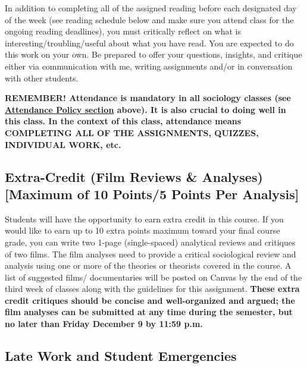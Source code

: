 \documentclass[11pt,]{article}
\begin{document}
In addition to completing all of the assigned reading before each
designated day of the week (see reading schedule below and make sure you
attend class for the ongoing reading deadlines), you must critically
reflect on what is interesting/troubling/useful about what you have
read. You are expected to do this work on your own. Be prepared to offer
your questions, insights, and critique either via communication with me,
writing assignments and/or in conversation with other students.

\textbf{REMEMBER! Attendance is mandatory in all sociology classes (see
\protect\hyperlink{attendance}{Attendance Policy section} above). It is
also crucial to doing well in this class. In the context of this class,
attendance means COMPLETING ALL OF THE ASSIGNMENTS, QUIZZES, INDIVIDUAL
WORK, etc.}

\hypertarget{extra-credit-film-reviews-analyses-maximum-of-10-points5-points-per-analysis}{%
\subsection{Extra-Credit (Film Reviews \& Analyses) {[}Maximum of 10
Points/5 Points Per
Analysis{]}}\label{extra-credit-film-reviews-analyses-maximum-of-10-points5-points-per-analysis}}

Students will have the opportunity to earn extra credit in this course.
If you would like to earn up to 10 extra points maximum toward your
final course grade, you can write two 1-page (single-spaced) analytical
reviews and critiques of two films. The film analyses need to provide a
critical sociological review and analysis using one or more of the
theories or theorists covered in the course. A list of suggested films/
documentaries will be posted on Canvas by the end of the third week of
classes along with the guidelines for this assignment. \textbf{These
extra credit critiques should be concise and well-organized and argued;
the film analyses can be submitted at any time during the semester, but
no later than Friday December 9 by 11:59 p.m.}

\hypertarget{late-work-and-student-emergencies}{%
\subsection{Late Work and Student
Emergencies}\label{late-work-and-student-emergencies}}
\end{document}
